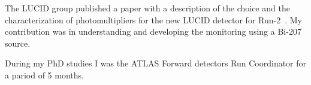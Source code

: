 The LUCID group published a paper with a description of the choice and the characterization of photomultipliers for the new LUCID detector for Run-2~\cite{Alberghi:2016tad}.
My contribution was in understanding and developing the monitoring using a Bi-207 source.

During my PhD studies I was the ATLAS Forward detectors Run Coordinator for a pariod of 5 months.


% 
%  
% 
%  
%  
